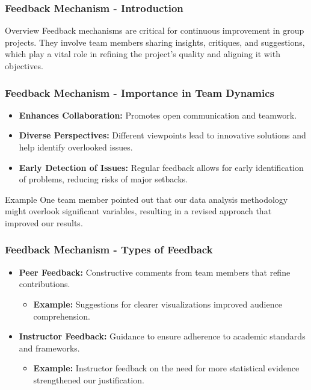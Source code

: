 \documentclass[aspectratio=169]{beamer}
\begin{document}
\begin{frame}[fragile]
    \frametitle{Feedback Mechanism - Introduction}
    \begin{block}{Overview}
    Feedback mechanisms are critical for continuous improvement in group projects. They involve team members sharing insights, critiques, and suggestions, which play a vital role in refining the project's quality and aligning it with objectives.
    \end{block}
\end{frame}

\begin{frame}[fragile]
    \frametitle{Feedback Mechanism - Importance in Team Dynamics}
    \begin{itemize}
        \item \textbf{Enhances Collaboration:} Promotes open communication and teamwork.
        \item \textbf{Diverse Perspectives:} Different viewpoints lead to innovative solutions and help identify overlooked issues.
        \item \textbf{Early Detection of Issues:} Regular feedback allows for early identification of problems, reducing risks of major setbacks.
    \end{itemize}
    \begin{block}{Example}
    One team member pointed out that our data analysis methodology might overlook significant variables, resulting in a revised approach that improved our results.
    \end{block}
\end{frame}

\begin{frame}[fragile]
    \frametitle{Feedback Mechanism - Types of Feedback}
    \begin{itemize}
        \item \textbf{Peer Feedback:} Constructive comments from team members that refine contributions.
            \begin{itemize}
                \item \textbf{Example:} Suggestions for clearer visualizations improved audience comprehension.
            \end{itemize}
        \item \textbf{Instructor Feedback:} Guidance to ensure adherence to academic standards and frameworks.
            \begin{itemize}
                \item \textbf{Example:} Instructor feedback on the need for more statistical evidence strengthened our justification.
            \end{itemize}
    \end{itemize}
\end{frame}
\end{document}

